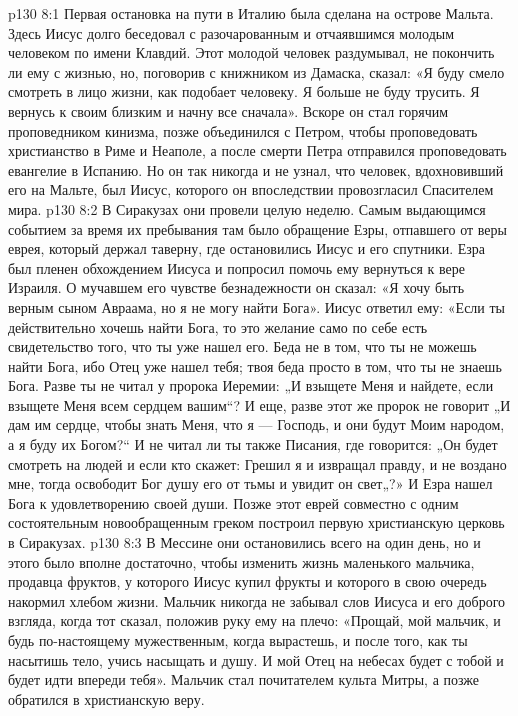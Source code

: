 \vs p130 8:1 Первая остановка на пути в Италию была сделана на острове Мальта. Здесь Иисус долго беседовал с разочарованным и отчаявшимся молодым человеком по имени Клавдий. Этот молодой человек раздумывал, не покончить ли ему с жизнью, но, поговорив с книжником из Дамаска, сказал: «Я буду смело смотреть в лицо жизни, как подобает человеку. Я больше не буду трусить. Я вернусь к своим близким и начну все сначала». Вскоре он стал горячим проповедником кинизма, позже объединился с Петром, чтобы проповедовать христианство в Риме и Неаполе, а после смерти Петра отправился проповедовать евангелие в Испанию. Но он так никогда и не узнал, что человек, вдохновивший его на Мальте, был Иисус, которого он впоследствии провозгласил Спасителем мира.
\vs p130 8:2 \pc В Сиракузах они провели целую неделю. Самым выдающимся событием за время их пребывания там было обращение Езры, отпавшего от веры еврея, который держал таверну, где остановились Иисус и его спутники. Езра был пленен обхождением Иисуса и попросил помочь ему вернуться к вере Израиля. О мучавшем его чувстве безнадежности он сказал: «Я хочу быть верным сыном Авраама, но я не могу найти Бога». Иисус ответил ему: «Если ты действительно хочешь найти Бога, то это желание само по себе есть свидетельство того, что ты уже нашел его. Беда не в том, что ты не можешь найти Бога, ибо Отец уже нашел тебя; твоя беда просто в том, что ты не знаешь Бога. Разве ты не читал у пророка Иеремии: „И взыщете Меня и найдете, если взыщете Меня всем сердцем вашим“? И еще, разве этот же пророк не говорит „И дам им сердце, чтобы знать Меня, что я --- Господь, и они будут Моим народом, а я буду их Богом?“ И не читал ли ты также Писания, где говорится: „Он будет смотреть на людей и если кто скажет: Грешил я и извращал правду, и не воздано мне, тогда освободит Бог душу его от тьмы и увидит он свет„?» И Езра нашел Бога к удовлетворению своей души. Позже этот еврей совместно с одним состоятельным новообращенным греком построил первую христианскую церковь в Сиракузах.
\vs p130 8:3 \pc В Мессине они остановились всего на один день, но и этого было вполне достаточно, чтобы изменить жизнь маленького мальчика, продавца фруктов, у которого Иисус купил фрукты и которого в свою очередь накормил хлебом жизни. Мальчик никогда не забывал слов Иисуса и его доброго взгляда, когда тот сказал, положив руку ему на плечо: «Прощай, мой мальчик, и будь по\hyp{}настоящему мужественным, когда вырастешь, и после того, как ты насытишь тело, учись насыщать и душу. И мой Отец на небесах будет с тобой и будет идти впереди тебя». Мальчик стал почитателем культа Митры, а позже обратился в христианскую веру.
